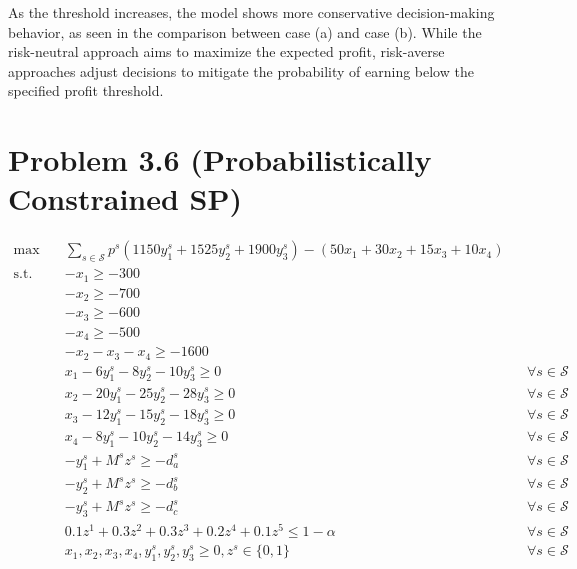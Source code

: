 \documentclass[7pt]{article}
\begin{document}
As the threshold increases, the model shows more conservative decision-making
behavior, as seen in the comparison between case (a) and case (b). While the
risk-neutral approach aims to maximize the expected profit, risk-averse
approaches adjust decisions to mitigate the probability of earning below the
specified profit threshold.

\section{Problem 3.6 (Probabilistically Constrained SP)}
\begin{align*}
    \max \quad
     & \sum_{s \in \mathcal{S}} p^s \left(1150y_1^s + 1525y_2^s + 1900 y_3^s \right)
    - \left(50 x_1 + 30 x_2 + 15 x_3 + 10 x_4 \right)                                                               \\
    \text{s.t.} \quad
     & -x_1 \geq -300                                                                                               \\
     & -x_2 \geq -700                                                                                               \\
     & -x_3 \geq -600                                                                                               \\
     & -x_4 \geq -500                                                                                               \\
     & -x_2 - x_3 - x_4 \geq -1600                                                                                  \\
     & x_1 - 6 y_1^s - 8 y_2^s - 10 y_3^s \geq 0 \quad                               &  & \forall s \in \mathcal{S} \\
     & x_2 - 20 y_1^s - 25 y_2^s - 28 y_3^s \geq 0 \quad                             &  & \forall s \in \mathcal{S} \\
     & x_3 - 12 y_1^s - 15 y_2^s - 18 y_3^s \geq 0 \quad                             &  & \forall s \in \mathcal{S} \\
     & x_4 - 8 y_1^s - 10 y_2^s - 14 y_3^s \geq 0 \quad                              &  & \forall s \in \mathcal{S} \\
     & -y_1^s + M^sz^s \geq -d_a^s                                                   &  & \forall s \in \mathcal{S} \\
     & -y_2^s + M^sz^s \geq -d_b^s                                                   &  & \forall s \in \mathcal{S} \\
     & -y_3^s + M^sz^s\geq -d_c^s                                                    &  & \forall s \in \mathcal{S} \\
     & 0.1z^1+ 0.3z^2+0.3z^3+0.2z^4+0.1z^5 \leq 1-\alpha                             &  & \forall s \in \mathcal{S} \\
     & x_1, x_2, x_3, x_4, y_1^s, y_2^s, y_3^s \geq 0, z^s \in \{0,1\}               &  & \forall s \in \mathcal{S}
\end{align*}
\end{document}
